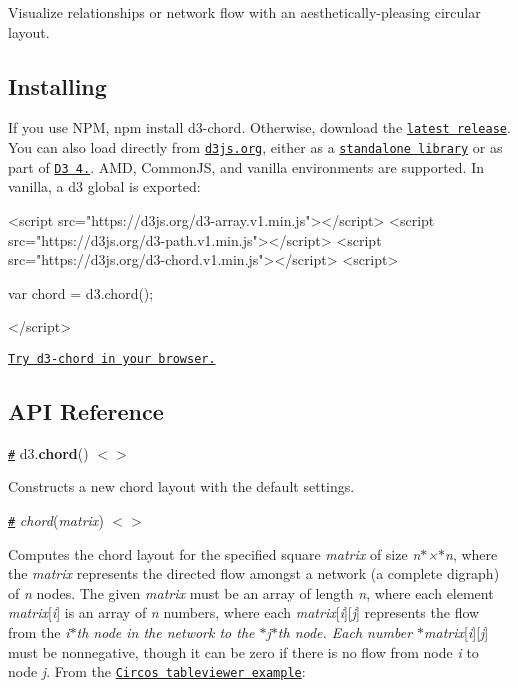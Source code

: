 Visualize relationships or network flow with an aesthetically-\/pleasing circular layout.

\href{http://bl.ocks.org/mbostock/4062006}{\tt }

\subsection*{Installing}

If you use N\+PM, {\ttfamily npm install d3-\/chord}. Otherwise, download the \href{https://github.com/d3/d3-chord/releases/latest}{\tt latest release}. You can also load directly from \href{https://d3js.org}{\tt d3js.\+org}, either as a \href{https://d3js.org/d3-chord.v1.min.js}{\tt standalone library} or as part of \href{https://github.com/d3/d3}{\tt D3 4.}. A\+MD, Common\+JS, and vanilla environments are supported. In vanilla, a {\ttfamily d3} global is exported\+:


\begin{DoxyCode}
<script src="https://d3js.org/d3-array.v1.min.js"></script>
<script src="https://d3js.org/d3-path.v1.min.js"></script>
<script src="https://d3js.org/d3-chord.v1.min.js"></script>
<script>

var chord = d3.chord();

</script>
\end{DoxyCode}


\href{https://tonicdev.com/npm/d3-chord}{\tt Try d3-\/chord in your browser.}

\subsection*{A\+PI Reference}

\href{#chord}{\tt \#} d3.{\bfseries chord}() \href{https://github.com/d3/d3-chord/blob/master/src/chord.js}{\tt $<$$>$}

Constructs a new chord layout with the default settings.

\href{#_chord}{\tt \#} {\itshape chord}({\itshape matrix}) \href{https://github.com/d3/d3-chord/blob/master/src/chord.js#L19}{\tt $<$$>$}

Computes the chord layout for the specified square {\itshape matrix} of size {\itshape n$\ast$×$\ast$n}, where the {\itshape matrix} represents the directed flow amongst a network (a complete digraph) of {\itshape n} nodes. The given {\itshape matrix} must be an array of length {\itshape n}, where each element {\itshape matrix}\mbox{[}{\itshape i}\mbox{]} is an array of {\itshape n} numbers, where each {\itshape matrix}\mbox{[}{\itshape i}\mbox{]}\mbox{[}{\itshape j}\mbox{]} represents the flow from the {\itshape i$\ast$th node in the network to the $\ast$j$\ast$th node. Each number $\ast$matrix}\mbox{[}{\itshape i}\mbox{]}\mbox{[}{\itshape j}\mbox{]} must be nonnegative, though it can be zero if there is no flow from node {\itshape i} to node {\itshape j}. From the \href{http://mkweb.bcgsc.ca/circos/guide/tables/}{\tt Circos tableviewer example}\+:


